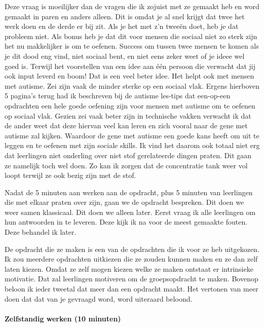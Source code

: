 \documentclass{article}
\begin{document}
                    Deze vraag is moeilijker dan de vragen die ik zojuist met ze gemaakt heb en word gemaakt in paren en anders alleen. Dit is omdat je al snel krijgt dat twee het werk doen en de derde er bij zit. Als je het met z'n tweeën doet, heb je dat probleem niet. Als bonus heb je dat dit voor mensen die sociaal niet zo sterk zijn het nu makkelijker is om te oefenen. Success om tussen twee mensen te komen als je dit dood eng vind, niet sociaal bent, en niet eens zeker weet of je ideee wel goed is. Terwijl het voorstellen van een idee aan één persoon die verwacht dat jij ook input leverd en boom! Dat is een veel beter idee. Het helpt ook met mensen met autisme. Zei zijn vaak de minder sterke op een sociaal vlak. Ergens hierboven 5 pagina's terug had ik beschreven bij de autisme les-tips dat een-op-een opdrachten een hele goede oefening zijn voor mensen met autisme om te oefenen op sociaal vlak. Gezien zei vaak beter zijn in technische vakken verwacht ik dat de ander weet dat deze hiervan veel kan leren en zich vooral naar de gene met autisme zal kijken. Waardoor de gene met autisme een goede kans heeft om uit te leggen en te oefenen met zijn sociale skills. Ik vind het daarom ook totaal niet erg dat leerlingen niet onderling over niet stof gerelateerde dingen praten. Dit gaan ze namelijk toch wel doen. Zo kan ik zorgen dat de concentratie tank weer vol loopt terwijl ze ook bezig zijn met de stof.

                    Nadat de 5 minuten aan werken aan de opdracht, plus 5 minuten van leerlingen die met elkaar praten over zijn, gaan we de opdracht bespreken. Dit doen we weer samen klassicaal. Dit doen we alleen later. Eerst vraag ik alle leerlingen om hun antwoorden in te  leveren. Deze kijk ik na voor de meest gemaakte fouten. Deze behandel ik later.

                    De opdracht die ze maken is een van de opdrachten die ik voor ze heb uitgekozen. Ik zou meerdere opdrachten uitkiezen die ze zouden kunnen maken en ze dan zelf laten kiezen. Omdat ze zelf mogen kiezen welke ze maken ontstaat er intrinsieke motivatie.\cite{NAME-ME} Dat zal leerlingen motiveren om de groepsopdracht te maken. Bovenop beloon ik ieder tweetal dat meer dan een opdracht maakt. Het vertonen van meer doen dat dat van je gevraagd word, word uiteraard beloond.
                
                \bigskip\noindent\paragraph{Zelfstandig werken (10 minuten)}
                    
\end{document}
